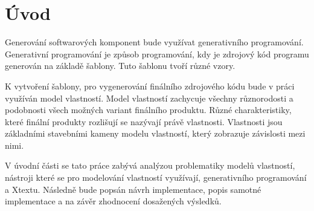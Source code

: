 \chapter{Úvod}

Generování softwarových komponent bude využívat generativního programování. Generativní programování je způsob programování, kdy je zdrojový kód programu generován na základě šablony. Tuto šablonu tvoří různé vzory.  

K vytvoření šablony, pro vygenerování finálního zdrojového kódu bude v práci využíván model vlastností. Model vlastností zachycuje všechny různorodosti a podobnosti všech možných variant finálního produktu. Různé charakteristiky, které finální produkty rozlišují se nazývají právě vlastnosti. Vlastnosti jsou základními stavebními kameny modelu vlastností, který zobrazuje závislosti mezi nimi.  

V úvodní části se tato práce zabývá analýzou problematiky modelů vlastností, nástroji které se pro modelování vlastností využívají, generativního programování a Xtextu. Následně bude popsán návrh implementace, popis samotné implementace a na závěr zhodnocení dosažených výsledků.


